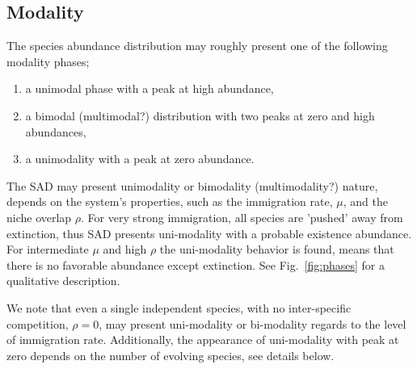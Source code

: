 \documentclass[%
 amsmath,amssymb,
 reprint,%
]{revtex4-2}
\begin{document}
\subsection{Modality}
The species abundance distribution may roughly present one of the following modality phases; 
\begin{enumerate}[label=(\Roman*)]
    \item a unimodal phase with a peak at high abundance, 
    \item a bimodal (multimodal?) distribution with two peaks at zero and high abundances,
    \item a unimodality with a peak at zero abundance.
\end{enumerate}
The SAD may present unimodality or bimodality (multimodality?) nature, depends on the system's properties, such as the immigration rate, $\mu$, and the niche overlap $\rho$. %
%
%
For very strong immigration, all species are 'pushed' away from extinction, thus SAD presents uni-modality with a probable existence abundance.   For intermediate $\mu$ and high $\rho$ the uni-modality behavior is found, means that there is no favorable abundance except extinction. See Fig.~\ref{fig:phases} for  a qualitative description.  %


We note that even a single independent species, with no inter-specific competition, $\rho=0$, may present uni-modality or bi-modality regards to the level of immigration rate. Additionally, the appearance of uni-modality with peak at zero depends on the number of evolving species, see details below.  
\end{document}
